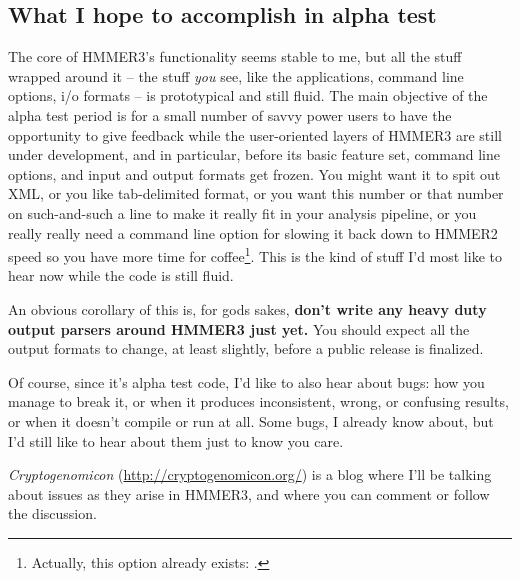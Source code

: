 \subsection{What I hope to accomplish in alpha test}

The core of HMMER3's functionality seems stable to me, but all the
stuff wrapped around it -- the stuff \emph{you} see, like the
applications, command line options, i/o formats -- is prototypical and
still fluid.  The main objective of the alpha test period is for a
small number of savvy power users to have the opportunity to give
feedback while the user-oriented layers of HMMER3 are still under
development, and in particular, before its basic feature set, command
line options, and input and output formats get frozen. You might want
it to spit out XML, or you like tab-delimited format, or you want this
number or that number on such-and-such a line to make it really fit in
your analysis pipeline, or you really really need a command line
option for slowing it back down to HMMER2 speed so you have more time
for coffee\footnote{Actually, this option already exists:
.}. This is the kind of stuff I'd most like to hear now
while the code is still fluid.

\begin{sidebar}
An obvious corollary of this is, for gods sakes, \textbf{don't write
any heavy duty output parsers around HMMER3 just yet.} You should
expect all the output formats to change, at least slightly, before a
public release is finalized.
\end{sidebar}

Of course, since it's alpha test code, I'd like to also hear about
bugs: how you manage to break it, or when it produces inconsistent,
wrong, or confusing results, or when it doesn't compile or run at all.
Some bugs, I already know about, but I'd still like to hear about them
just to know you care.

\emph{Cryptogenomicon}
(\url{http://cryptogenomicon.org/}) is a blog where
I'll be talking about issues as they arise in HMMER3, and where you
can comment or follow the discussion.





















  









